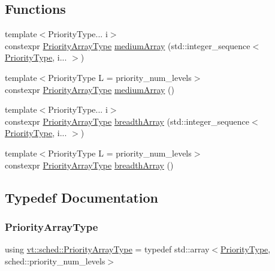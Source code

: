 \subsection*{Functions}
\begin{DoxyCompactItemize}
\item 
{\footnotesize template$<$Priority\+Type... i$>$ }\\constexpr \hyperlink{namespacevt_1_1sched_a2dbd1daff26f79efbff3f418ad9b2a8b}{Priority\+Array\+Type} \hyperlink{namespacevt_1_1sched_a05afd033ab9ecc1f0d1dc37b8b9b7827}{medium\+Array} (std\+::integer\+\_\+sequence$<$ \hyperlink{namespacevt_a86bff9f556eb761b27fc8600d006ac04}{Priority\+Type}, i... $>$)
\item 
{\footnotesize template$<$Priority\+Type L = priority\+\_\+num\+\_\+levels$>$ }\\constexpr \hyperlink{namespacevt_1_1sched_a2dbd1daff26f79efbff3f418ad9b2a8b}{Priority\+Array\+Type} \hyperlink{namespacevt_1_1sched_a3f4c11ddd24523a16b3f3606a4662014}{medium\+Array} ()
\item 
{\footnotesize template$<$Priority\+Type... i$>$ }\\constexpr \hyperlink{namespacevt_1_1sched_a2dbd1daff26f79efbff3f418ad9b2a8b}{Priority\+Array\+Type} \hyperlink{namespacevt_1_1sched_a4a522d8f67561a0ae0446769584c2deb}{breadth\+Array} (std\+::integer\+\_\+sequence$<$ \hyperlink{namespacevt_a86bff9f556eb761b27fc8600d006ac04}{Priority\+Type}, i... $>$)
\item 
{\footnotesize template$<$Priority\+Type L = priority\+\_\+num\+\_\+levels$>$ }\\constexpr \hyperlink{namespacevt_1_1sched_a2dbd1daff26f79efbff3f418ad9b2a8b}{Priority\+Array\+Type} \hyperlink{namespacevt_1_1sched_ac82001576ed1c9cee962ed07113cebe7}{breadth\+Array} ()
\end{DoxyCompactItemize}


\subsection{Typedef Documentation}
\mbox{\label{namespacevt_1_1sched_a2dbd1daff26f79efbff3f418ad9b2a8b}} 
\subsubsection{\texorpdfstring{Priority\+Array\+Type}{PriorityArrayType}}
{\footnotesize\ttfamily using \hyperlink{namespacevt_1_1sched_a2dbd1daff26f79efbff3f418ad9b2a8b}{vt\+::sched\+::\+Priority\+Array\+Type} = typedef std\+::array$<$\hyperlink{namespacevt_a86bff9f556eb761b27fc8600d006ac04}{Priority\+Type}, sched\+::priority\+\_\+num\+\_\+levels$>$}



